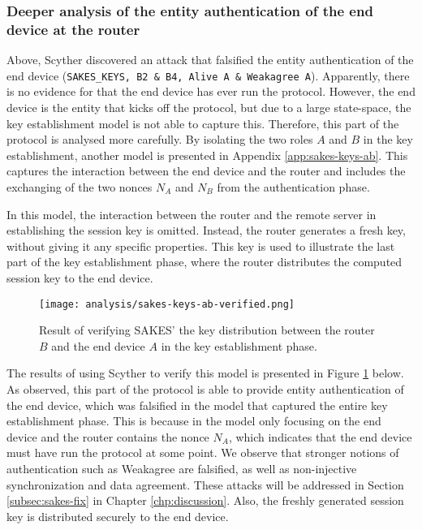 \subsubsection{Deeper analysis of the entity authentication of the end device at the router}

Above, Scyther discovered an attack that falsified the entity authentication of the end device (\texttt{SAKES\_KEYS, B2 \& B4, Alive A \& Weakagree A}). Apparently, there is no evidence for that the end device has ever run the protocol. However, the end device is the entity that kicks off the protocol, but due to a large state-space, the key establishment model is not able to capture this. Therefore, this part of the protocol is analysed more carefully. By isolating the two roles $A$ and $B$ in the key establishment, another model is presented in Appendix \ref{app:sakes-keys-ab}. This captures the interaction between the end device and the router and includes the exchanging of the two nonces $N_A$ and $N_B$ from the authentication phase.

In this model, the interaction between the router and the remote server in establishing the session key is omitted. Instead, the router generates a fresh key, without giving it any specific properties. This key is used to illustrate the last part of the key establishment phase, where the router distributes the computed session key to the end device.

\begin{figure}[h]
	\centering
	\texttt{[image: analysis/sakes-keys-ab-verified.png]}
	\caption{Result of verifying SAKES' the key distribution between the router $B$ and the end device $A$ in the key establishment phase.}
	\label{fig:sakes-verified-keys-ab}
\end{figure}

The results of using Scyther to verify this model is presented in Figure \ref{fig:sakes-verified-keys-ab} below. As observed, this part of the protocol is able to provide entity authentication of the end device, which was falsified in the model that captured the entire key establishment phase. This is because in the model only focusing on the end device and the router contains the nonce $N_A$, which indicates that the end device must have run the protocol at some point. We observe that stronger notions of authentication such as Weakagree are falsified, as well as non-injective synchronization and data agreement. These attacks will be addressed in Section \ref{subsec:sakes-fix} in Chapter \ref{chp:discussion}. Also, the freshly generated session key is distributed securely to the end device.


